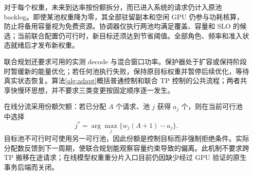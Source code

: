 对于每个权重，未来到达率按份额拆分，而已进入系统的请求仍计入原池 backlog。即使某池权重降为零，其全部驻留副本和空闲 GPU 仍参与功耗核算，防止将备用容量视为免费资源。协调器仅执行两池均满足覆盖、容量和 SLO 的候选；当前联合配置仍可行时，新目标还须达到节省阈值。全部角色、频率和准入状态就绪后才发布新权重。

联合规划还要求可用的实测 decode 与混合窗口功率。保护器处于扩容或保持阶段时暂缓新的能量优化；若任何池执行失败，保持原目标权重并暂停后续优化，等待真实状态恢复。算法\ref{alg:adapt}概括普通控制和联合 TP 控制的公共流程；两者共享快慢环思想，并不要求三类变更按固定顺序逐一发生。

在线分流采用份额欠额：若已分配 $A$ 个请求、池 $j$ 获得 $a_j$ 个，则在当前可行池中选择
\begin{equation}
 j^*=\arg\max_j\{w_j(A+1)-a_j\}.
\end{equation}
目标池不可行时可使用另一可行池，因此份额是控制目标而非强制拒绝条件。实际分配数反馈到下一周期，使联合规划能观察容量约束导致的偏离。此机制不要求跨 TP 搬移在途请求；在线模型权重重分片入口目前仍因缺少经过 GPU 验证的原生事务后端而关闭。
